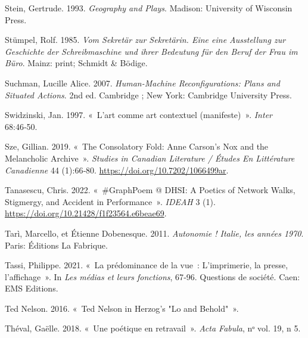 \begin{CSLReferences}{1}{0}
\leavevmode{}%
Stein, Gertrude. 1993. \emph{Geography and {Plays}}. {Madison}:
{University of Wisconsin Press}.

\leavevmode{}%
Stümpel, Rolf. 1985. \emph{{Vom Sekret{ä}r zur Sekret{ä}rin. Eine eine
Ausstellung zur Geschichte der Schreibmaschine und ihrer Bedeutung f{ü}r
den Beruf der Frau im B{ü}ro}}. {Mainz}: print; {Schmidt \& B{ö}dige}.

\leavevmode{}%
Suchman, Lucille Alice. 2007. \emph{Human-{Machine Reconfigurations}:
{Plans} and {Situated Actions}}. 2nd ed. {Cambridge ; New York}:
{Cambridge University Press}.

\leavevmode{}%
Swidzinski, Jan. 1997. {«~{L'art comme art contextuel (manifeste)}~»}.
\emph{Inter} 68:46‑50.

\leavevmode{}%
Sze, Gillian. 2019. {«~The {Consolatory Fold}: {Anne Carson}'s {Nox} and
the {Melancholic Archive}~»}. \emph{Studies in Canadian Literature /
{É}tudes En Litt{é}rature Canadienne} 44 (1):66‑80.
\url{https://doi.org/10.7202/1066499ar}.

\leavevmode{}%
Tanasescu, Chris. 2022. {«~\#{GraphPoem} @ {DHSI}: {A Poetics} of
{Network Walks}, {Stigmergy}, and {Accident} in {Performance}~»}.
\emph{IDEAH} 3 (1). \url{https://doi.org/10.21428/f1f23564.e6beae69}.

\leavevmode{}%
Tarì, Marcello, et Étienne Dobenesque. 2011. \emph{{Autonomie ! Italie,
les ann{é}es 1970}}. {Paris}: {{É}ditions La Fabrique}.

\leavevmode{}%
Tassi, Philippe. 2021. {«~{La pr{é}dominance de la vue~: L'imprimerie,
la presse, l'affichage}~»}. In \emph{{Les m{é}dias et leurs fonctions}},
67‑96. {Questions de soci{é}t{é}}. {Caen}: {EMS Editions}.

\leavevmode{}%
Ted Nelson. 2016. {«~Ted {Nelson} in {Herzog}'s "{Lo} and {Behold}"~»}.

\leavevmode{}%
Théval, Gaëlle. 2018. {«~{Une po{é}tique en retravail}~»}. \emph{Acta
Fabula}, nᵒ vol. 19, n{\textdegree} 5.


\end{CSLReferences}
